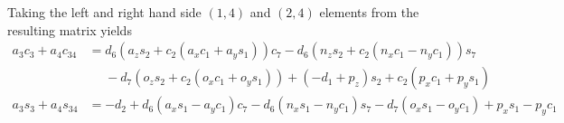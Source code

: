 \documentclass[onecolumn,10pt]{jhwhw}
\begin{document}
Taking the left and right hand side $\left(1, 4\right)$ and $\left(2, 4 \right)$ elements from the resulting matrix yields
\begin{align*}
a_{3} c_{3} + a_{4} c_{34} &= d_{6} \left(a_{z} s_{2} + c_{2}\left(a_{x} c_{1} + a_{y} s_{1}\right) \right) c_{7} - d_{6} \left(n_{z} s_{2} + c_{2}\left(n_{x} c_{1} - n_{y} c_{1} \right) \right) s_{7}  \\
                           &\phantom{=} - d_{7} \left(o_{z} s_{2} + c_{2}\left(o_{x} c_{1} + o_{y} s_{1} \right) \right) + \left(- d_{1} + p_{z}\right) s_{2} + c_{2}\left(p_{x} c_{1} + p_{y} s_{1}\right) \\
a_{3} s_{3} + a_{4} s_{34} &= - d_{2} + d_{6} \left(a_{x} s_{1} - a_{y} c_{1}\right) c_{7} - d_{6} \left(n_{x} s_{1} - n_{y} c_{1}\right) s_{7} - d_{7} \left(o_{x} s_{1} - o_{y} c_{1}\right) + p_{x} s_{1} - p_{y} c_{1}
\end{align*}

\nocite{*}
 

\end{document}
